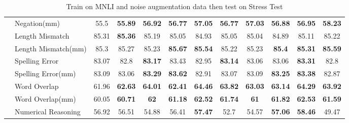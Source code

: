 \begin{table}[]
\begin{tabular}{|c|l|c|c|c|c|c|c|c|c|c|c|}
\multicolumn{1}{|l|}{}                          & Negation(mm)                 & 55.5                      & \textbf{55.89}                 & \textbf{56.92} & \textbf{56.77} & \textbf{57.05} & \textbf{56.77} & \textbf{57.03} & \textbf{56.88} & \textbf{56.95} & \textbf{58.23} \\ \cline{2-12} 
\multicolumn{1}{|l|}{}                          & Length Mismatch              & 85.31                     & \textbf{85.36}                 & 85.19          & 85.05          & 84.93          & 85.05          & 85.04          & 84.89          & 85.11          & 85.22          \\ \cline{2-12} 
\multicolumn{1}{|l|}{}                          & Length Mismatch(mm)          & 85.3                      & 85.27                          & 85.23          & \textbf{85.67} & \textbf{85.54} & 85.22          & 85.23          & \textbf{85.4}  & \textbf{85.31} & \textbf{85.59} \\ \cline{2-12} 
\multicolumn{1}{|l|}{}                          & Spelling Error               & 83.07                     & 82.8                           & \textbf{83.17} & 83.43          & 82.95          & \textbf{83.14} & 83.06 & 83.06          & \textbf{83.31} & 82.8           \\ \cline{2-12} 
\multicolumn{1}{|l|}{}                          & Spelling Error(mm)           & 83.09                     & 83.06                          & \textbf{83.29} & \textbf{83.62} & 82.91          & 83.07          & 83.09          & \textbf{83.25} & \textbf{83.38} & 82.87          \\ \cline{2-12} 
\multicolumn{1}{|l|}{}                          & Word Overlap                 & 61.96                     & \textbf{62.63}                 & \textbf{64.01} & \textbf{62.41} & \textbf{64.46} & \textbf{63.82} & \textbf{63.03} & \textbf{63.14} & \textbf{64.29} & \textbf{63.92} \\ \cline{2-12} 
\multicolumn{1}{|l|}{}                          & Word Overlap(mm)             & 60.05                     & \textbf{60.71}                 & \textbf{62}    & \textbf{61.18} & \textbf{62.52} & \textbf{61.74} & \textbf{61}    & \textbf{61.82} & \textbf{62.53} & \textbf{61.59} \\ \cline{2-12} 
\multicolumn{1}{|l|}{}                          & Numerical Reasoning          & 56.92                     & 56.51                 & 54.88          & 56.41          & \textbf{57.47} & 52.7           & 54.57          & \textbf{57.06} & \textbf{58.46} & 49.47          \\ \hline
\end{tabular}
	\caption{Train on MNLI and noise augmentation data then test on Stress Test}
	\label{tab:mnli-stress}
\end{table}

